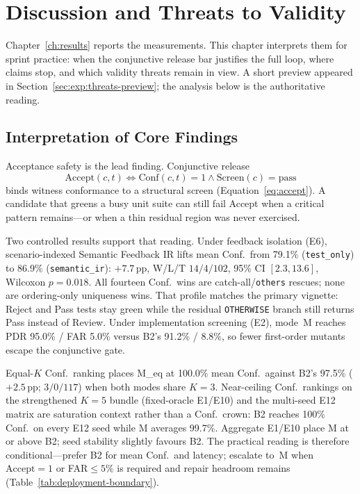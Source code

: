 
\chapter{Discussion and Threats to Validity}
\label{ch:discussion}

Chapter~\ref{ch:results} reports the measurements.
This chapter interprets them for sprint practice: when the conjunctive release
bar justifies the full loop, where claims stop, and which validity threats
remain in view.
A short preview appeared in Section~\ref{sec:exp:threats-preview}; the
analysis below is the authoritative reading.


\section{Interpretation of Core Findings}
\label{sec:disc:interpretation}

Acceptance safety is the lead finding.
Conjunctive release
\[
  \mathrm{Accept}(c,t) \iff \mathrm{Conf}(c,t)=1 \land \mathrm{Screen}(c)=\mathrm{pass}
\]
binds witness conformance to a structural screen
(Equation~\eqref{eq:accept}).
A candidate that greens a busy unit suite can still fail Accept when a
critical pattern remains---or when a thin residual region was never exercised.

Two controlled results support that reading.
Under feedback isolation (E6), scenario-indexed Semantic Feedback IR lifts
mean Conf.\ from 79.1\% (\texttt{test\_only}) to 86.9\%
(\texttt{semantic\_ir}): ${+}7.7$\,pp, W/L/T $14/4/102$,
95\% CI $[2.3,13.6]$, Wilcoxon $p{=}0.018$.
All fourteen Conf.\ wins are catch-all/\texttt{others} rescues; none are
ordering-only uniqueness wins.
That profile matches the primary vignette: Reject and Pass tests stay green
while the residual \texttt{OTHERWISE} branch still returns Pass instead of
Review.
Under implementation screening (E2), mode~M reaches PDR 95.0\% / FAR 5.0\%
versus B2's 91.2\% / 8.8\%, so fewer first-order mutants escape the
conjunctive gate.

Equal-$K$ Conf.\ ranking places M\_eq at 100.0\% mean Conf.\ against B2's 97.5\%
(${+}2.5$\,pp; $3/0/117$) when both modes share $K{=}3$.
Near-ceiling Conf.\ rankings on the strengthened $K{=}5$ bundle (fixed-oracle
E1/E10) and the multi-seed E12 matrix are saturation context rather than a
Conf.\ crown: B2 reaches 100\% Conf.\ on every E12 seed while M averages
99.7\%.
Aggregate E1/E10 place M at or above B2; seed stability slightly favours B2.
The practical reading is therefore conditional---prefer B2 for mean Conf.\ and
latency; escalate to~M when $\mathrm{Accept}{=}1$ or FAR${\le}5\%$ is required
and repair headroom remains (Table~\ref{tab:deployment-boundary}).

